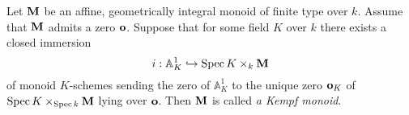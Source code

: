 \begin{definition}
Let $\mathbf{M}$ be an affine, geometrically integral monoid of finite type over $k$. Assume that $\mathbf{M}$ admits a zero $\mathbf{o}$. Suppose that for some field $K$ over $k$ there exists a closed immersion
$$i:\mathbb{A}^1_K\hookrightarrow \mathrm{Spec}\, K\times_k\mathbf{M}$$
of monoid $K$-schemes sending the zero of $\mathbb{A}^1_K$ to the unique zero $\mathbf{o}_K$ of $\mathrm{Spec}\, K\times_{\mathrm{Spec}\, k}\mathbf{M}$ lying over $\mathbf{o}$. Then $\mathbf{M}$ is called \textit{a Kempf monoid}.
\end{definition}






























\small




